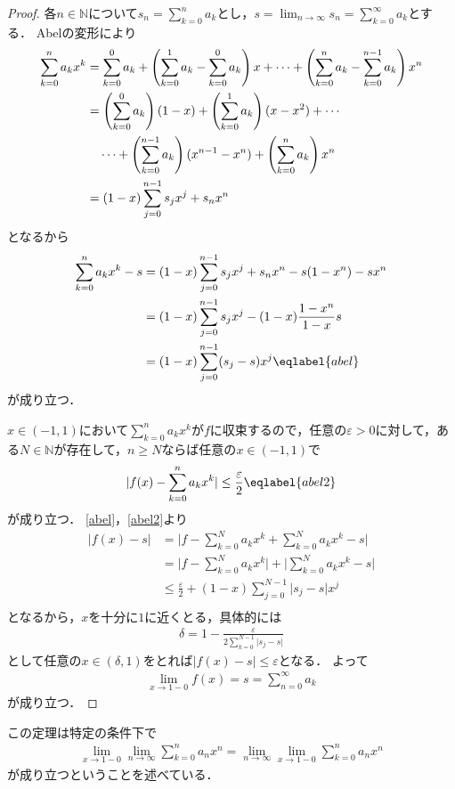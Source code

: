 \documentclass[../main.tex]{subfiles}
\begin{document}
\begin{proof}
各\(n \in \mathbb{N}\)について\(s_n = \sum_{k = 0}^n a_k\)とし，\(s = \lim_{n \to \infty} s_n = \sum_{k = 0}^\infty a_k\)とする．
Abelの変形により
\begin{align*}
    \sum_{k = 0}^n a_k x^k
    &= \sum_{k = 0}^{0} a_k
    + \left(\sum_{k = 0}^1 a_k - \sum_{k = 0}^{0} a_k \right) x
    + \cdots +
    \left(\sum_{k = 0}^n a_k - \sum_{k = 0}^{n - 1} a_k \right) x^n \\
    &=
    \left(\sum_{k = 0}^{0} a_k \right) (1 - x)
    +
    \left(\sum_{k = 0}^{1} a_k \right) (x - x^2)
    + \cdots \\
    &\mathbin{\hphantom{=}} \cdots +
    \left(\sum_{k = 0}^{n - 1} a_k \right) (x^{n - 1} - x^n)
    + \left(\sum_{k = 0}^n a_k \right) x^n \\
    &=
    (1 - x) \sum_{j = 0}^{n - 1} s_j x^j
    + s_n x^n
\end{align*}
となるから
\begin{align}
  \sum_{k = 0}^n a_k x^k - s
  &= (1 - x) \sum_{j = 0}^{n - 1} s_j x^j + s_n x^n - s (1 - x^n) - s x^n \notag \\
  &= (1 - x) \sum_{j = 0}^{n - 1} s_j x^j - (1 - x)\frac{1 - x^n}{1 - x}s \notag \\
  &= (1 - x) \sum_{j = 0}^{n - 1} (s_j - s) x^j \eqlabel{abel}
\end{align}
が成り立つ．

\(x \in (-1, 1)\)において\(\sum_{k = 0}^n a_k x^k \)が\(f\)に収束するので，任意の\(\varepsilon > 0\)に対して，ある\(N \in \mathbb{N}\)が存在して，\(n \geq N\)ならば任意の\(x \in (-1, 1)\)で
\begin{align}
  \lvert f(x)  - \sum_{k = 0}^n a_k x^k\rvert \leq \frac{\varepsilon}{2} \eqlabel{abel2}
\end{align}
が成り立つ．
\eqref{abel}，\eqref{abel2}より
\begin{align*}
    \lvert f(x) - s \rvert
    &= \lvert f - \sum_{k = 0}^N a_k x^k + \sum_{k = 0}^N a_k x^k - s \rvert \\
    &= \lvert f - \sum_{k = 0}^N a_k x^k \rvert + \lvert \sum_{k = 0}^N a_k x^k - s \rvert \\
    &\leq \frac{\varepsilon}{2} + (1 - x) \sum_{j = 0}^{N - 1}\lvert s_j - s\rvert x^j \\
\end{align*}
となるから，\(x\)を十分に\(1\)に近くとる，具体的には
\begin{align*}
  \delta = 1 - \frac{\varepsilon}{2\sum_{k = 0}^{N - 1} \lvert s_j  - s \rvert}
\end{align*}
として任意の\(x \in (\delta, 1)\)をとれば\(\lvert f(x) - s \rvert\leq \varepsilon\)となる．
よって
\begin{align*}
  \lim_{x \to 1 - 0}f(x) = s = \sum_{n = 0}^\infty a_k
\end{align*}
が成り立つ．
\end{proof}

この定理は特定の条件下で
\begin{align*}
\lim_{x \to 1 - 0} \lim_{n \to \infty}\sum_{k = 0}^n a_n x^n = \lim_{n \to \infty} \lim_{x \to 1 - 0}\sum_{k = 0}^n a_n x^n
\end{align*}
が成り立つということを述べている．
\end{document}
